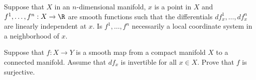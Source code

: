 \begin{alist}
\item Suppose that $X$ in an $n$-dimensional manifold, $x$ is a point
in $X$ and $f^1,\ldots ,f^n:X\rightarrow \R$ are smooth functions such
that the differentials $df^1_x,\ldots ,df^n_x$ are linearly
independent at $x$. Is $f^1,\ldots ,f^n$ necessarily a local
coordinate system in a neighborhood of $x$.
\item Suppose that $f:X\rightarrow Y$ is a smooth map from a compact
manifold $X$ to a connected manifold. Assume that $df_x$ is invertible
for all $x\in X$. Prove that $f$ is surjective.
\end{alist}
